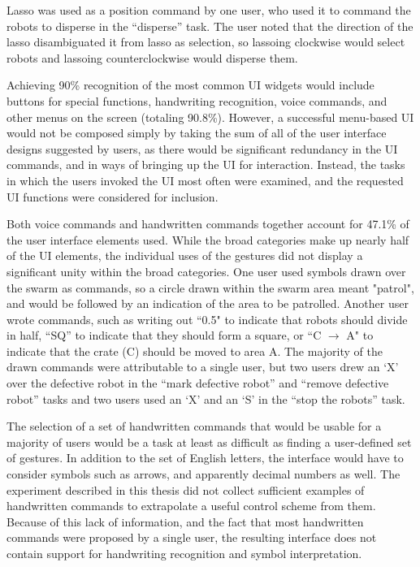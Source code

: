 Lasso was used as a position command by one user, who used it to command the robots to disperse in the ``disperse'' task. 
The user noted that the direction of the lasso disambiguated it from lasso as selection, so lassoing clockwise would select robots and lassoing counterclockwise would disperse them. 

Achieving 90\% recognition of the most common UI widgets would include buttons for special functions, handwriting recognition, voice commands, and other menus on the screen (totaling 90.8\%). 
However, a successful menu-based UI would not be composed simply by taking the sum of all of the user interface designs suggested by users, as there would be significant redundancy in the UI commands, and in ways of bringing up the UI for interaction. 
Instead, the tasks in which the users invoked the UI most often were examined, and the requested UI functions were considered for inclusion. 

Both voice commands and handwritten commands together account for 47.1\% of the user interface elements used.
While the broad categories make up nearly half of the UI elements, the individual uses of the gestures did not display a significant unity within the broad categories.
One user used symbols drawn over the swarm as commands, so a circle drawn within the swarm area meant "patrol", and would be followed by an indication of the area to be patrolled. 
Another user wrote commands, such as writing out ``0.5" to indicate that robots should divide in half, ``SQ'' to indicate that they should form a square, or ``C $\rightarrow$ A" to indicate that the crate (C) should be moved to area A. 
The majority of the drawn commands were attributable to a single user, but two users drew an `X' over the defective robot in the ``mark defective robot'' and ``remove defective robot'' tasks and two users used an `X' and an `S' in the ``stop the robots'' task.

The selection of a set of handwritten commands that would be usable for a majority of users would be a task at least as difficult as finding a user-defined set of gestures.
In addition to the set of English letters, the interface would have to consider symbols such as arrows, and apparently decimal numbers as well. 
The experiment described in this thesis did not collect sufficient examples of handwritten commands to extrapolate a useful control scheme from them.
Because of this lack of information, and the fact that most handwritten commands were proposed by a single user, the resulting interface does not contain support for handwriting recognition and symbol interpretation.  


